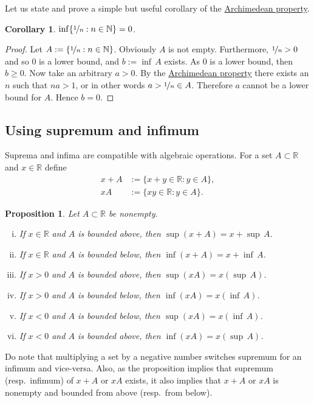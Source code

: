 \documentclass[12pt]{book}
\newcommand{\R}{{\mathbb{R}}}
\newcommand{\N}{{\mathbb{N}}}
\theoremstyle{plain}
\newtheorem{prop}[thm]{Proposition}
\newtheorem{cor}[thm]{Corollary}
\theoremstyle{remark}
\theoremstyle{definition}
\theoremstyle{exercise}
\theoremstyle{example}
\begin{document}
Let us state and prove a simple but useful corollary of the
\hyperref[thm:arch:i]{Archimedean property}.

\begin{cor}
$\inf \{ \nicefrac{1}{n} : n \in \N \} = 0$.
\end{cor}

\begin{proof}
Let $A := \{ \nicefrac{1}{n} : n \in \N \}$.  Obviously $A$ is not empty.
Furthermore,
$\nicefrac{1}{n} > 0$ and so 0 is a lower bound, and $b := \inf\, A$ exists.
As 0 is a lower bound, then $b \geq 0$.
Now take an arbitrary $a > 0$.  By the
\hyperref[thm:arch:i]{Archimedean property} there exists an $n$ such that
$na > 1$, or in other words $a > \nicefrac{1}{n} \in A$.  Therefore
$a$ cannot be a lower bound for $A$.  Hence $b=0$.
\end{proof}

\subsection{Using supremum and infimum}

Suprema and infima are
compatible with algebraic operations.  For a set $A \subset \R$ and 
$x \in \R$ define
\begin{align*}
x + A & := \{ x+y \in \R : y \in A \} , \\
xA & := \{ xy \in \R : y \in A \} .
\end{align*}

\begin{prop} \label{prop:supinfalg}
Let $A \subset \R$ be nonempty.
\begin{enumerate}[(i)]
\item If $x \in \R$ and $A$ is bounded above, then $\sup (x+A) = x + \sup\, A$.
\item If $x \in \R$ and $A$ is bounded below, then $\inf (x+A) = x + \inf\, A$.
\item If $x > 0$ and $A$ is bounded above, then $\sup (xA) = x ( \sup\, A )$.
\item If $x > 0$ and $A$ is bounded below, then $\inf (xA) = x ( \inf\, A )$.
\item If $x < 0$ and $A$ is bounded below, then $\sup (xA) = x ( \inf\, A )$.
\item If $x < 0$ and $A$ is bounded above, then $\inf (xA) = x ( \sup\, A )$.
\end{enumerate}
\end{prop}

Do note that multiplying a set by a negative number switches supremum for an
infimum and vice-versa.  Also, as the proposition implies that
supremum (resp.\ infimum) of $x+A$ or $xA$ exists, 
it also implies that $x+A$ or $xA$
is nonempty and bounded from above (resp.\ from below).
\end{document}
